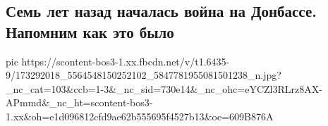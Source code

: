  
 
 
 
 

\subsection{Семь лет назад началась война на Донбассе. Напомним как это было}
\label{sec:14_04_2021.fb.butusov_jurij.1.vojna_7_let_donbass}

\ifcmt
  pic https://scontent-bos3-1.xx.fbcdn.net/v/t1.6435-9/173292018_5564548150252102_5847781955081501238_n.jpg?_nc_cat=103&ccb=1-3&_nc_sid=730e14&_nc_ohc=eYCZl3RLrz8AX-APmmd&_nc_ht=scontent-bos3-1.xx&oh=e1d096812cfd9ae62b555695f4527b13&oe=609B876A
\fi

